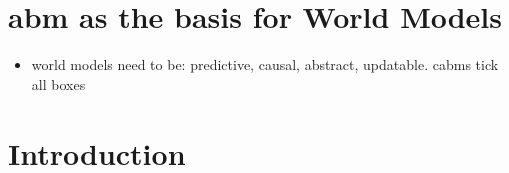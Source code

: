 \section{\acl{abm} as the basis for World Models}
\begin{itemize}
    \item world models need to be: predictive, causal, abstract, updatable. \acp{cabm} tick all
        boxes
\end{itemize}

\section{Introduction}
\label{sec:self-organization}
